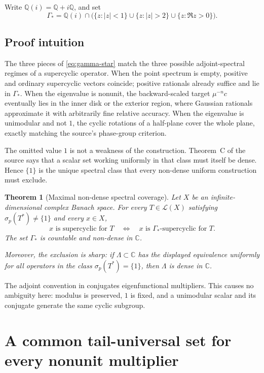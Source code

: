 \documentclass[11pt]{article}
\newtheorem{theorem}{Theorem}
\theoremstyle{definition}
\newcommand{\C}{\mathbb C}
\newcommand{\Q}{\mathbb Q}
\newcommand{\Gamstar}{\Gamma_{\!*}}
\begin{document}
Write $\Q(i)=\Q+i\Q$, and set
\begin{equation}\label{eq:gamma-star}
 \Gamstar=\Q(i)\cap\bigl(
 \{z:|z|<1\}\cup\{z:|z|>2\}\cup\{z:\Re z>0\}\bigr).
\end{equation}

\subsection*{Proof intuition}

The three pieces of \eqref{eq:gamma-star} match the three possible
adjoint-spectral regimes of a supercyclic operator.  When the point spectrum
is empty, positive and ordinary supercyclic vectors coincide; positive
rationals already suffice and lie in $\Gamstar$.  When the eigenvalue is
nonunit, the backward-scaled target $\mu^{-n}c$ eventually lies in the inner
disk or the exterior region, where Gaussian rationals approximate it with
arbitrarily fine relative accuracy.  When the eigenvalue is unimodular and
not $1$, the cyclic rotations of a half-plane cover the whole plane, exactly
matching the source's phase-group criterion.

The omitted value $1$ is not a weakness of the construction.  Theorem~C of
the source says that a scalar set working uniformly in that class must itself
be dense.  Hence $\{1\}$ is the unique spectral class that every non-dense
uniform construction must exclude.

\begin{theorem}[Maximal non-dense spectral coverage]\label{thm:main}
Let $X$ be an infinite-dimensional complex Banach space.  For every
$T\in\mathcal L(X)$ satisfying $\sigma_p(T^*)\ne\{1\}$ and every $x\in X$,
\[
 x\text{ is supercyclic for }T
 \quad\Longleftrightarrow\quad
 x\text{ is $\Gamstar$-supercyclic for }T.
\]
The set $\Gamstar$ is countable and non-dense in $\C$.

Moreover, the exclusion is sharp: if $\Lambda\subset\C$ has the displayed
equivalence uniformly for all operators in the class
$\sigma_p(T^*)=\{1\}$, then $\Lambda$ is dense in $\C$.
\end{theorem}

The adjoint convention in \cite{CEM} conjugates eigenfunctional multipliers.
This causes no ambiguity here: modulus is preserved, $1$ is fixed, and a
unimodular scalar and its conjugate generate the same cyclic subgroup.

\section{A common tail-universal set for every nonunit multiplier}
\end{document}
